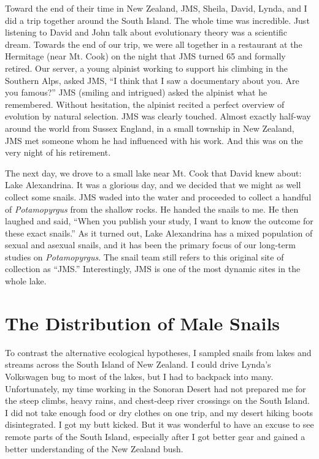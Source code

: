 \documentclass[
  letterpaper,
]{book}
\begin{document}
Toward the end of their time in New Zealand, JMS, Sheila, David, Lynda,
and I did a trip together around the South Island. The whole time was
incredible. Just listening to David and John talk about evolutionary
theory was a scientific dream. Towards the end of our trip, we were all
together in a restaurant at the Hermitage (near Mt. Cook) on the night
that JMS turned 65 and formally retired. Our server, a young alpinist
working to support his climbing in the Southern Alps, asked JMS, ``I
think that I saw a documentary about you. Are you famous?'' JMS (smiling
and intrigued) asked the alpinist what he remembered. Without
hesitation, the alpinist recited a perfect overview of evolution by
natural selection. JMS was clearly touched. Almost exactly half-way
around the world from Sussex England, in a small township in New
Zealand, JMS met someone whom he had influenced with his work. And this
was on the very night of his retirement.

The next day, we drove to a small lake near Mt. Cook that David knew
about: Lake Alexandrina. It was a glorious day, and we decided that we
might as well collect some snails. JMS waded into the water and
proceeded to collect a handful of \emph{Potamopyrgus} from the shallow
rocks. He handed the snails to me. He then laughed and said, ``When you
publish your study, I want to know the outcome for these exact snails.''
As it turned out, Lake Alexandrina has a mixed population of sexual and
asexual snails, and it has been the primary focus of our long-term
studies on \emph{Potamopyrgus}. The snail team still refers to this
original site of collection as ``JMS.'' Interestingly, JMS is one of the
most dynamic sites in the whole lake.

\section{The Distribution of Male
Snails}\label{the-distribution-of-male-snails}

To contrast the alternative ecological hypotheses, I sampled snails from
lakes and streams across the South Island of New Zealand. I could drive
Lynda's Volkswagen bug to most of the lakes, but I had to backpack into
many. Unfortunately, my time working in the Sonoran Desert had not
prepared me for the steep climbs, heavy rains, and chest-deep river
crossings on the South Island. I did not take enough food or dry clothes
on one trip, and my desert hiking boots disintegrated. I got my butt
kicked. But it was wonderful to have an excuse to see remote parts of
the South Island, especially after I got better gear and gained a better
understanding of the New Zealand bush.
\end{document}
